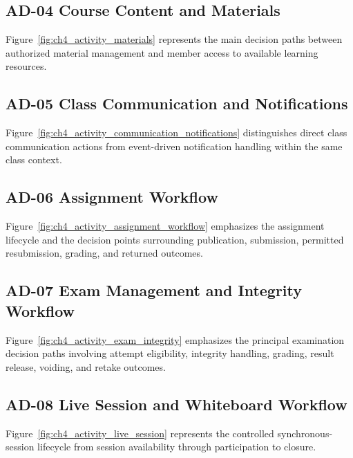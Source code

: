 \begin{samepage}
\subsection*{AD-04 Course Content and Materials}

Figure~\ref{fig:ch4_activity_materials} represents the main decision paths
between authorized material management and member access to available learning
resources.
\end{samepage}

\begin{samepage}
\subsection*{AD-05 Class Communication and Notifications}

Figure~\ref{fig:ch4_activity_communication_notifications} distinguishes direct
class communication actions from event-driven notification handling within the
same class context.
\end{samepage}

\begin{samepage}
\subsection*{AD-06 Assignment Workflow}

Figure~\ref{fig:ch4_activity_assignment_workflow} emphasizes the assignment
lifecycle and the decision points surrounding publication, submission,
permitted resubmission, grading, and returned outcomes.
\end{samepage}

\begin{samepage}
\subsection*{AD-07 Exam Management and Integrity Workflow}

Figure~\ref{fig:ch4_activity_exam_integrity} emphasizes the principal
examination decision paths involving attempt eligibility, integrity handling,
grading, result release, voiding, and retake outcomes.
\end{samepage}

\begin{samepage}
\subsection*{AD-08 Live Session and Whiteboard Workflow}

Figure~\ref{fig:ch4_activity_live_session} represents the controlled
synchronous-session lifecycle from session availability through participation
to closure.
\end{samepage}

